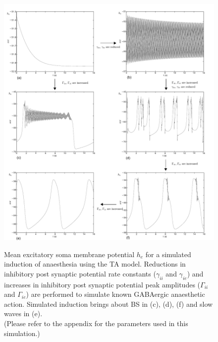 \documentclass[a4paper,12pt]{article}
\begin{document}
\begin{figure}
	\includegraphics[scale=0.75]{frontiers-2012-working-images/figure-1-thal.pdf}
	\label{fig:00143}
	\caption{Mean excitatory soma membrane potential $h_e$ for a simulated induction of anaesthesia using the TA model. 
Reductions in inhibitory post synaptic potential rate constants ($\gamma_{ii}$ and $\gamma_{ie}$) and increases in inhibitory post synaptic potential peak amplitudes ($\Gamma_{ii}$ and $\Gamma_{ie}$) are performed to simulate known GABAergic anaesthetic action. Simulated induction brings about BS in (c), (d), (f) and slow waves in (e).
\\
(Please refer to the appendix for the parameters used in this simulation.)
}
\end{figure}
\end{document}
